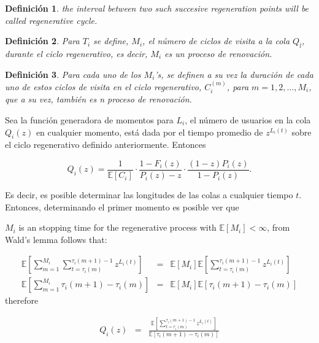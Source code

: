\documentclass{article}
\newtheorem{Def}{Definición}
\newcommand{\esp}{\mathbb{E}}
\begin{document}
\begin{Def}
the interval between two such succesive regeneration points will be called regenerative cycle.
\end{Def}

\begin{Def}
Para $T_{i}$ se define, $M_{i}$, el n\'umero de ciclos de visita a la cola $Q_{l}$, durante el ciclo regenerativo, es decir, $M_{i}$ es un proceso de renovaci\'on.
\end{Def}

\begin{Def}
Para cada uno de los $M_{i}$'s, se definen a su vez la duraci\'on de cada uno de estos ciclos de visita en el ciclo regenerativo, $C_{i}^{(m)}$, para $m=1,2,\ldots,M_{i}$, que a su vez, tambi\'en es n proceso de renovaci\'on.
\end{Def}



Sea la funci\'on generadora de momentos para $L_{i}$, el n\'umero de usuarios en la cola $Q_{i}\left(z\right)$ en cualquier momento, est\'a dada por el tiempo promedio de $z^{L_{i}\left(t\right)}$ sobre el ciclo regenerativo definido anteriormente. Entonces 

\begin{equation}\label{Eq.Longitud.Tiempo.t}
Q_{i}\left(z\right)=\frac{1}{\esp\left[C_{i}\right]}\cdot\frac{1-F_{i}\left(z\right)}{P_{i}\left(z\right)-z}\cdot\frac{\left(1-z\right)P_{i}\left(z\right)}{1-P_{i}\left(z\right)}.
\end{equation}

Es decir, es posible determinar las longitudes de las colas a cualquier tiempo $t$. Entonces, determinando el primer momento es posible ver que


$M_{i}$ is an stopping time for the regenerative process with $\esp\left[M_{i}\right]<\infty$, from Wald's lemma follows that:


\begin{eqnarray*}
\esp\left[\sum_{m=1}^{M_{i}}\sum_{t=\tau_{i}\left(m\right)}^{\tau_{i}\left(m+1\right)-1}z^{L_{i}\left(t\right)}\right]&=&\esp\left[M_{i}\right]\esp\left[\sum_{t=\tau_{i}\left(m\right)}^{\tau_{i}\left(m+1\right)-1}z^{L_{i}\left(t\right)}\right]\\
\esp\left[\sum_{m=1}^{M_{i}}\tau_{i}\left(m+1\right)-\tau_{i}\left(m\right)\right]&=&\esp\left[M_{i}\right]\esp\left[\tau_{i}\left(m+1\right)-\tau_{i}\left(m\right)\right]
\end{eqnarray*}
therefore 

\begin{eqnarray*}
Q_{i}\left(z\right)&=&\frac{\esp\left[\sum_{t=\tau_{i}\left(m\right)}^{\tau_{i}\left(m+1\right)-1}z^{L_{i}\left(t\right)}\right]}{\esp\left[\tau_{i}\left(m+1\right)-\tau_{i}\left(m\right)\right]}
\end{eqnarray*}
\end{document}

